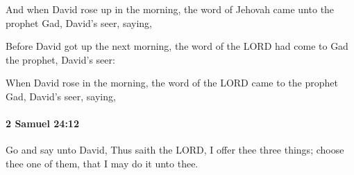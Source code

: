 			\begin{versebox}
					\item[BHS] 
					\item[ASV] And when David rose up in the morning, the word of Jehovah came unto the prophet Gad, David's seer, saying,
					\item[NIV] Before David got up the next morning, the word of the LORD had come to Gad the prophet, David’s seer:
					\item[NRSV] When David rose in the morning, the word of the LORD came to the prophet Gad, David’s seer, saying,
			\end{versebox}

		\paragraph{2 Samuel 24:12} %
			\label{2SAMUEL-24-12}

			Go and say unto David, Thus saith the LORD, I offer thee three things; choose thee one of them, that I may do it unto thee.

